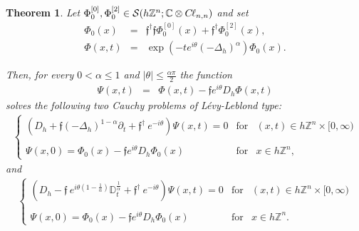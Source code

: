 \documentclass{elsarticle}
\newcommand{\BC}{{\mathbb C}}
\newcommand{\BZ}{{\mathbb Z}}
\newcommand{\RL}{{\mathbb D}_t}
\newcommand{\f}{{\mathfrak f}}
\newcommand{\cl}{C \kern -0.1em \ell}
\newtheorem{theorem}{Theorem}[section]
\begin{document}
\begin{theorem}\label{LevyLeblondSolutions}
	Let $\Phi^{[0]}_0,\Phi^{[2]}_0\in \mathcal{S}(h\BZ^n;\BC\otimes \cl_{n,n})$ and set
	\begin{eqnarray*}
		\Phi_0(x)&=&\f^\dagger\f\Phi^{[0]}_0(x)+\f^\dagger\Phi^{[2]}_0(x), \\
		\Phi(x,t)&=&\exp(-te^{i\theta}(-\Delta_h)^\alpha)\Phi_0(x).
	\end{eqnarray*}
	
	Then, for every $0<\alpha\leq 1$ and $|\theta|\leq \frac{\alpha \pi}{2}$ the function
	\begin{eqnarray}
		\label{HarmonicConjugatesTheta}\Psi(x,t)&=&\Phi(x,t)-\f e^{i\theta}D_h\Phi(x,t)
	\end{eqnarray}
	solves the following two Cauchy problems of L\'evy-Leblond type: \begin{eqnarray}
		\label{CauchyFractionalDiracAlpha} \left\{\begin{array}{lll} 
			\left(D_h+\f (-\Delta_h)^{1-\alpha}\partial_t+ \f^\dagger~e^{-i\theta}\right)\Psi(x,t)=0 & \mbox{for} & (x,t)\in
			h\BZ^n \times [0,\infty)
			\\ \ \\
			\Psi(x,0)=\Phi_0(x)
			-\f e^{i\theta}D_h\Phi_0(x)& \mbox{for} & x\in h\BZ^n,
		\end{array}\right.
	\end{eqnarray}
	and
	\begin{eqnarray}
		\label{CauchyFractionalRLt} \left\{\begin{array}{lll} 
			\left(D_h-\f~e^{i\theta \left(1-\frac{1}{\alpha}\right)} \RL^{\frac{1}{\alpha}}+ \f^\dagger~e^{-i\theta}\right)\Psi(x,t)=0 & \mbox{for} & (x,t)\in
			h\BZ^n \times [0,\infty)
			\\ \ \\
			\Psi(x,0)=\Phi_0(x)
			-\f e^{i\theta}D_h\Phi_0(x)& \mbox{for} & x\in h\BZ^n.
		\end{array}\right.
	\end{eqnarray}
	
\end{theorem}
\end{document}
